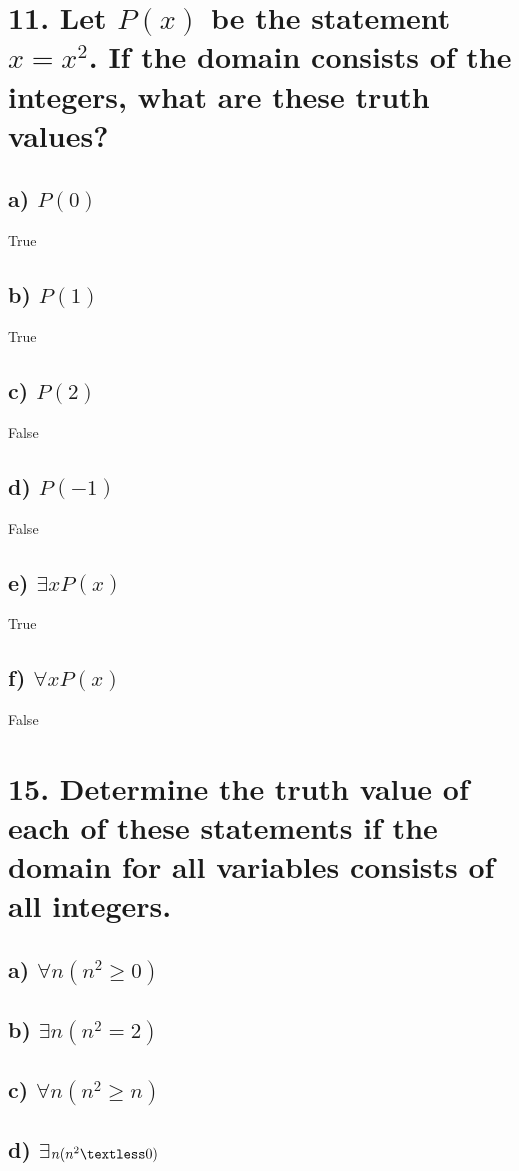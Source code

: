 \documentclass[11pt, oneside]{article} %
\numberwithin{equation}{section} %
\numberwithin{figure}{section} %
\begin{document}
\begin{table}[!htp]
\section{11. Let $P(x)$ be the statement ${x = x^2}$. If the domain consists of the integers, what are these truth values?}
\subsection{a) $P(0)$}
True
\subsection{b) $P(1)$}
True
\subsection{c) $P(2)$}
False
\subsection{d) $P(-1)$}
False
\subsection{e) $\exists$$xP(x)$}
True
\subsection{f) $\forall$$xP(x)$}
False

\end{table}
\begin{table}[!htp]
\section{15. Determine the truth value of each of these statements if the domain for all variables consists of all integers.}
\subsection{a) $\forall$$n(n^2 \geq 0)$}
\subsection{b) $\exists$$n(n^2 = 2)$}
\subsection{c) $\forall$$n(n^2 \geq n)$}
\subsection{d) $\exists$$n(n^2 \textless 0)$}
\end{table}
\end{document}
